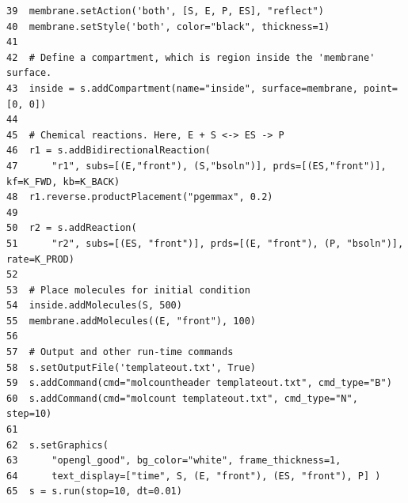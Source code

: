 \documentclass {scrbook}
\begin{document}
\begin{lstlisting}[style=SSAPython]
39  membrane.setAction('both', [S, E, P, ES], "reflect")
40  membrane.setStyle('both', color="black", thickness=1)
41  
42  # Define a compartment, which is region inside the 'membrane' surface.
43  inside = s.addCompartment(name="inside", surface=membrane, point=[0, 0])
44  
45  # Chemical reactions. Here, E + S <-> ES -> P
46  r1 = s.addBidirectionalReaction(
47      "r1", subs=[(E,"front"), (S,"bsoln")], prds=[(ES,"front")], kf=K_FWD, kb=K_BACK)
48  r1.reverse.productPlacement("pgemmax", 0.2)
49  
50  r2 = s.addReaction(
51      "r2", subs=[(ES, "front")], prds=[(E, "front"), (P, "bsoln")], rate=K_PROD)
52  
53  # Place molecules for initial condition
54  inside.addMolecules(S, 500)
55  membrane.addMolecules((E, "front"), 100)
56  
57  # Output and other run-time commands
58  s.setOutputFile('templateout.txt', True)
59  s.addCommand(cmd="molcountheader templateout.txt", cmd_type="B")
60  s.addCommand(cmd="molcount templateout.txt", cmd_type="N", step=10)
61  
62  s.setGraphics(
63      "opengl_good", bg_color="white", frame_thickness=1,
64      text_display=["time", S, (E, "front"), (ES, "front"), P] )
65  s = s.run(stop=10, dt=0.01)
\end{lstlisting}
\end{document}

